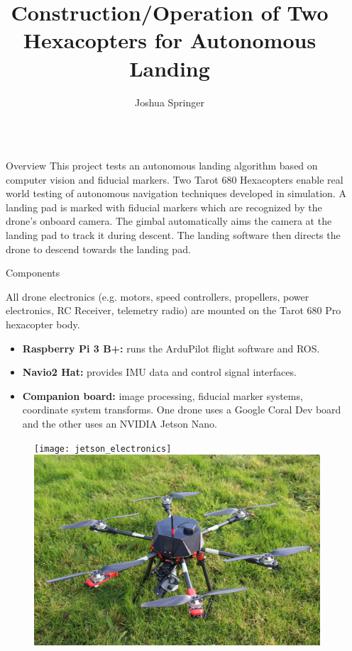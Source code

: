 \documentclass[final, 20pt]{beamer}
\title{Construction/Operation of Two Hexacopters for Autonomous Landing}
\author{Joshua Springer}
\institute[shortinst]{Reykjavík University}
\newlength{\sepwidth}
\newlength{\colwidth}
\newcommand{\separatorcolumn}{\begin{column}{\sepwidth}\end{column}}
\begin{document}
\begin{frame}[t]
\begin{columns}[t]
\separatorcolumn

\begin{column}{\colwidth}

  \begin{block}{Overview}
    This project tests an autonomous landing algorithm based on computer vision and fiducial markers.\cite{AL_thesis}
    Two Tarot 680 Hexacopters enable real world testing of autonomous navigation techniques developed in simulation.
    A landing pad is marked with fiducial markers which are recognized by the drone's onboard camera.
    The gimbal automatically aims the camera at the landing pad to track it during descent.
    The landing software then directs the drone to descend towards the landing pad.
  \end{block}

  \begin{alertblock}{Components}

    All drone electronics (e.g. motors, speed controllers, propellers, power electronics, RC Receiver, telemetry radio) are mounted on the Tarot 680 Pro hexacopter body.

    \begin{itemize}
      \item \textbf{Raspberry Pi 3 B+:} runs the ArduPilot flight software and ROS.
      \item \textbf{Navio2 Hat:} provides IMU data and control signal interfaces.
      \item \textbf{Companion board:} image processing, fiducial marker systems, coordinate system transforms. One drone uses a Google Coral Dev board and the other uses an NVIDIA Jetson Nano.
    \end{itemize}

    \begin{figure}
      \texttt{[image: jetson\_electronics]}
      \includegraphics[width=0.45\linewidth]{jetson_drone.jpg}
    \end{figure}


\end{alertblock}
\end{column}
\end{columns}
\end{frame}
\end{document}

